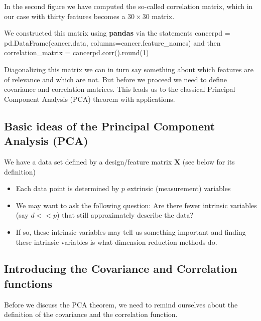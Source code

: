 \documentclass[%
oneside,                 %
final,                   %
10pt]{article}
\begin{document}
In the second figure we have computed the so-called correlation
matrix, which in our case with thirty features becomes a $30\times 30$
matrix.

We constructed this matrix using \textbf{pandas} via the statements
\bpycod
cancerpd = pd.DataFrame(cancer.data, columns=cancer.feature_names)
\epycod
and then
\bpycod
correlation_matrix = cancerpd.corr().round(1)
\epycod

Diagonalizing this matrix we can in turn say something about which
features are of relevance and which are not. But before we proceed we
need to define covariance and correlation matrices. This leads us to
the classical Principal Component Analysis (PCA) theorem with
applications.



\subsection{Basic ideas of the Principal Component Analysis (PCA)}

We have a data set defined by a design/feature matrix $\bm{X}$ (see below for its definition) 
\begin{itemize}
\item Each data point is determined by $p$ extrinsic (measurement) variables

\item We may want to ask the following question: Are there fewer intrinsic variables (say $d << p$) that still approximately describe the data?

\item If so, these intrinsic variables may tell us something important and finding these intrinsic variables is what dimension reduction methods do. 
\end{itemize}

\noindent
\subsection{Introducing the Covariance and Correlation functions}

Before we discuss the PCA theorem, we need to remind ourselves about
the definition of the covariance and the correlation function.
\end{document}
